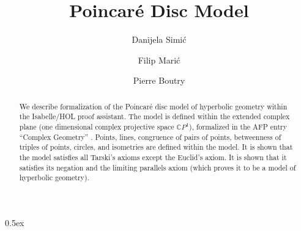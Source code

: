 \documentclass[8pt,a4paper]{article}
\begin{document}
\title{Poincar\'e Disc Model}
\author{Danijela Simi\'c  \and
 Filip Mari\'c  \and
 Pierre Boutry}
\maketitle

\begin{abstract}
  We describe formalization of the Poincar\'e disc model of hyperbolic
  geometry within the Isabelle/HOL proof assistant. The model is
  defined within the extended complex plane (one dimensional complex
  projective space $\mathbb{C}P^1$), formalized in the AFP entry
  ``Complex Geometry'' \cite{afp-complex-geometry}. Points, lines,
  congruence of pairs of points, betweenness of triples of points,
  circles, and isometries are defined within the model. It is shown
  that the model satisfies all Tarski's axioms except the Euclid's
  axiom. It is shown that it satisfies its negation and the limiting
  parallels axiom (which proves it to be a model of hyperbolic
  geometry).
\end{abstract}

\tableofcontents

\parindent 0pt\parskip 0.5ex

\clearpage


\clearpage


\end{document}
